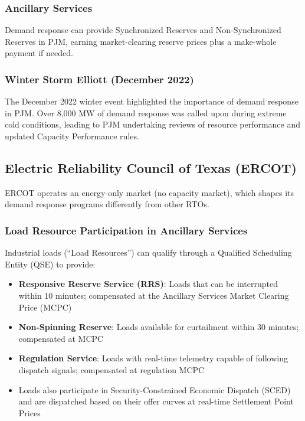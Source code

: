 \documentclass[12pt]{article}
\begin{document}
\subsubsection{Ancillary Services}
Demand response can provide Synchronized Reserves and Non-Synchronized Reserves in PJM, earning market-clearing reserve prices plus a make-whole payment if needed.

\subsubsection{Winter Storm Elliott (December 2022)}
The December 2022 winter event highlighted the importance of demand response in PJM. Over 8,000 MW of demand response was called upon during extreme cold conditions, leading to PJM undertaking reviews of resource performance and updated Capacity Performance rules.

\subsection{Electric Reliability Council of Texas (ERCOT)}

ERCOT operates an energy-only market (no capacity market), which shapes its demand response programs differently from other RTOs.

\subsubsection{Load Resource Participation in Ancillary Services}
Industrial loads (``Load Resources'') can qualify through a Qualified Scheduling Entity (QSE) to provide:
\begin{itemize}
    \item \textbf{Responsive Reserve Service (RRS)}: Loads that can be interrupted within 10 minutes; compensated at the Ancillary Services Market Clearing Price (MCPC)
    \item \textbf{Non-Spinning Reserve}: Loads available for curtailment within 30 minutes; compensated at MCPC
    \item \textbf{Regulation Service}: Loads with real-time telemetry capable of following dispatch signals; compensated at regulation MCPC
    \item Loads also participate in Security-Constrained Economic Dispatch (SCED) and are dispatched based on their offer curves at real-time Settlement Point Prices
\end{itemize}
\end{document}
